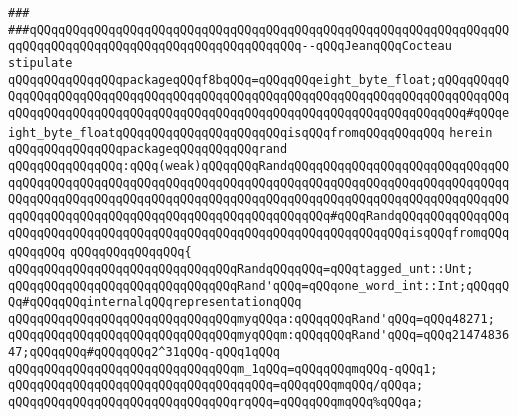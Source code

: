 \verb|###|\newline
\verb|###qQQqqQQqqQQqqQQqqQQqqQQqqQQqqQQqqQQqqQQqqQQqqQQqqQQqqQQqqQQqqQQqqQQqqQQqqQQqqQQqqQQqqQQqqQQqqQQqqQQqqQQqqQQq--qQQqJeanqQQqCocteau|\newline
\newline
\newline
\newline
\verb|stipulate|\newline
\verb|qQQqqQQqqQQqqQQqpackageqQQqf8bqQQq=qQQqqQQqeight_byte_float;qQQqqQQqqQQqqQQqqQQqqQQqqQQqqQQqqQQqqQQqqQQqqQQqqQQqqQQqqQQqqQQqqQQqqQQqqQQqqQQqqQQqqQQqqQQqqQQqqQQqqQQqqQQqqQQqqQQqqQQqqQQqqQQqqQQqqQQqqQQqqQQq#qQQqeight_byte_floatqQQqqQQqqQQqqQQqqQQqqQQqisqQQqfromqQQqqQQqqQQq|\newline
\verb|herein|\newline
\newline
\verb|qQQqqQQqqQQqqQQqpackageqQQqqQQqqQQqrand|\newline
\verb|qQQqqQQqqQQqqQQq:qQQq(weak)qQQqqQQqRandqQQqqQQqqQQqqQQqqQQqqQQqqQQqqQQqqQQqqQQqqQQqqQQqqQQqqQQqqQQqqQQqqQQqqQQqqQQqqQQqqQQqqQQqqQQqqQQqqQQqqQQqqQQqqQQqqQQqqQQqqQQqqQQqqQQqqQQqqQQqqQQqqQQqqQQqqQQqqQQqqQQqqQQqqQQqqQQqqQQqqQQqqQQqqQQqqQQqqQQqqQQqqQQqqQQqqQQq#qQQqRandqQQqqQQqqQQqqQQqqQQqqQQqqQQqqQQqqQQqqQQqqQQqqQQqqQQqqQQqqQQqqQQqqQQqqQQqisqQQqfromqQQqqQQqqQQq|\newline
\verb|qQQqqQQqqQQqqQQq{|\newline
\verb|qQQqqQQqqQQqqQQqqQQqqQQqqQQqqQQqRandqQQqqQQq=qQQqtagged_unt::Unt;|\newline
\verb|qQQqqQQqqQQqqQQqqQQqqQQqqQQqqQQqRand'qQQq=qQQqone_word_int::Int;qQQqqQQq#qQQqqQQqinternalqQQqrepresentationqQQq|\newline
\newline
\verb|qQQqqQQqqQQqqQQqqQQqqQQqqQQqqQQqmyqQQqa:qQQqqQQqRand'qQQq=qQQq48271;|\newline
\verb|qQQqqQQqqQQqqQQqqQQqqQQqqQQqqQQqmyqQQqm:qQQqqQQqRand'qQQq=qQQq2147483647;qQQqqQQq#qQQqqQQq2^31qQQq-qQQq1qQQq|\newline
\newline
\verb|qQQqqQQqqQQqqQQqqQQqqQQqqQQqqQQqm_1qQQq=qQQqqQQqmqQQq-qQQq1;|\newline
\newline
\verb|qQQqqQQqqQQqqQQqqQQqqQQqqQQqqQQqqqQQq=qQQqqQQqmqQQq/qQQqa;|\newline
\verb|qQQqqQQqqQQqqQQqqQQqqQQqqQQqqQQqrqQQq=qQQqqQQqmqQQq%qQQqa;|\newline
